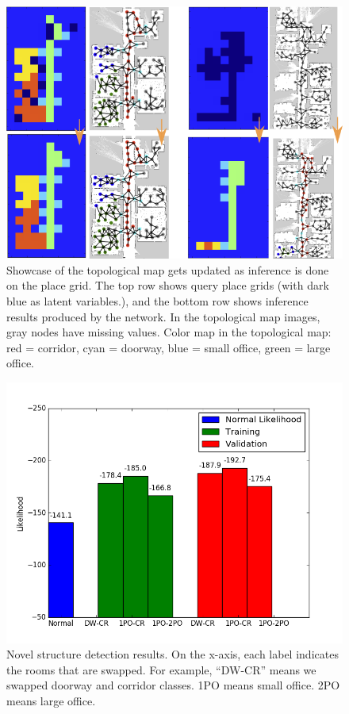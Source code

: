 \documentclass[11pt, titlepage]{article}
\theoremstyle{definition}
\begin{document}
\begin{figure}[!htb]
    \centering
    \captionsetup{width=.8\linewidth}
    \includegraphics[scale=0.7]{images/placegri_graph_illustration.png}
    \caption{Showcase of the topological map gets updated as inference is done on the place grid. The top row shows query place grids (with dark blue as latent variables.), and the bottom row shows inference results produced by the network. In the topological map images, gray nodes have missing values. Color map in the topological map: red = corridor, cyan = doorway, blue = small office, green = large office.}
    \label{fig:pg_graph}
\end{figure}


\begin{figure}[!htb]
    \centering
    \captionsetup{width=.8\linewidth}
    \includegraphics[scale=0.4]{images/novelty.png}
    \caption{Novel structure detection results. On the x-axis, each label indicates the rooms that are swapped. For example, ``DW-CR'' means we swapped doorway and corridor classes. 1PO means small office. 2PO means large office.}
    \label{fig:novelty}
\end{figure}
\end{document}
